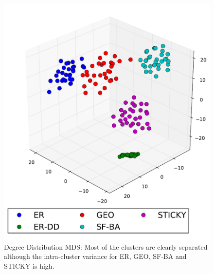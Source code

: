 \begin{figure}[H]
  \captionsetup{width=8cm}
  \hspace{-2.0em}
  \begin{minipage}[b]{0.55\linewidth}
    \centering
    \includegraphics[scale=0.45]
    {../code/final_results/trade_2010_thresholded/eval_results/deg_distrib_mds.pdf}
    \caption[Degree Distribution MDS]{Degree Distribution MDS: Most of the clusters are clearly separated although the intra-cluster variance for ER, GEO, SF-BA and STICKY is high.}
    \label{fig:degree_distrib_mds}
  \end{minipage}%
  \begin{minipage}[b]{0.55\linewidth}
    \centering

\end{minipage}
\end{figure}
